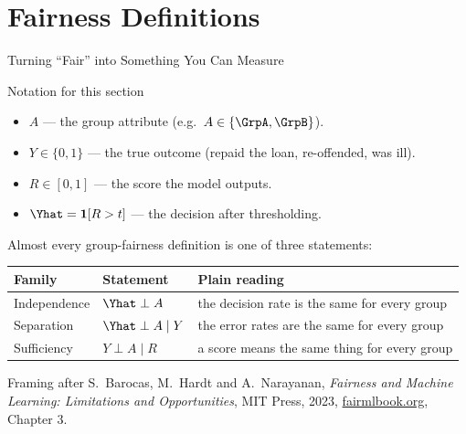 \section{Fairness Definitions}

\begin{frame}{Turning ``Fair'' into Something You Can Measure}

    \begin{block}{Notation for this section}
        \begin{itemize}
            \item $A$ --- the group attribute (e.g.\ $A \in \{\GrpA, \GrpB\}$).
            \item $Y \in \{0,1\}$ --- the true outcome (repaid the loan, re-offended, was ill).
            \item $R \in [0,1]$ --- the score the model outputs.
            \item $\Yhat = \mathbf{1}[R > t]$ --- the decision after thresholding.
        \end{itemize}
    \end{block}

    \vspace{0.8em}

    Almost every group-fairness definition is one of three statements:

    \vspace{0.4em}
    \centering
    \small
    \begin{tabular}{lll}
        \toprule
        \textbf{Family} & \textbf{Statement} & \textbf{Plain reading} \\
        \midrule
        Independence & $\Yhat \perp A$ & the decision rate is the same for every group \\
        Separation   & $\Yhat \perp A \mid Y$ & the error rates are the same for every group \\
        Sufficiency  & $Y \perp A \mid R$ & a score means the same thing for every group \\
        \bottomrule
    \end{tabular}

    \vspace{1em}
    \raggedright
    {\scriptsize Framing after S.~Barocas, M.~Hardt and A.~Narayanan, \emph{Fairness and Machine
    Learning: Limitations and Opportunities}, MIT Press, 2023,
    \href{https://fairmlbook.org/}{fairmlbook.org}, Chapter 3.}
\end{frame}

